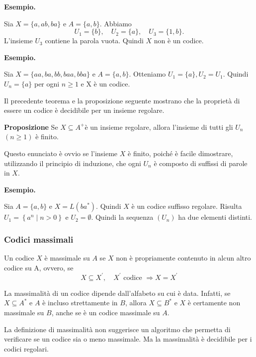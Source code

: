 \textbf{Esempio.}

Sia $X=\{a, a b, b a\}$ e $A=\{a, b\}$. Abbiamo
$$
U_{1}=\{b\}, \quad U_{2}=\{a\}, \quad U_{3}=\{1, b\} .
$$
L'insieme $U_{3}$ contiene la parola vuota. Quindi $X$ non è un codice.

\vspace{5mm}


\textbf{Esempio.}

Sia $X=\{a a, b a, b b, b a a, b b a\}$ e $A=\{a, b\} .$ Otteniamo $U_{1}=\{a\}, U_{2}=U_{1}$. Quindi $U_{n}=\{a\}$ per ogni $n \geq 1$ e X è un codice.

\vspace{5mm}

Il precedente teorema e la proposizione seguente mostrano che la proprietà di essere un codice è decidibile per un insieme regolare.


\textbf{Proposizione}
Se $X \subseteq A^{+}$è un insieme regolare, allora l'insieme di tutti gli $U_{n}$ $(n \geq 1)$ è finito.

Questo enunciato è ovvio se l'insieme $X$ è finito, poiché è facile dimostrare, utilizzando il principio di induzione, che ogni $U_{n}$ è composto di suffissi di parole in $X$.

\vspace{5mm}

\textbf{Esempio.}

Sia $A=\{a, b\}$ e $X=L\left(b a^{*}\right)$. Quindi $X$ è un codice suffisso regolare.
Risulta $U_{1}=\left\{a^{n} \mid n>0\right\}$ e $U_{2}=\emptyset$. Quindi la sequenza $\left(U_{n}\right)$ ha due elementi distinti.

\subsubsection{Codici massimali}

Un codice $X$ è massimale su $A$ se $X$ non è propriamente contenuto in alcun altro codice su A, ovvero, se
$$
X \subseteq X^{\prime}, \quad X^{\prime} \text { codice } \Rightarrow X=X^{\prime}
$$

La massimalità di un codice dipende dall'alfabeto su cui è data. Infatti, se $X \subseteq A^{*}$ e $A$ è incluso strettamente in $B$, allora $X \subseteq B^{*}$ e $X$ è certamente non massimale su $B$, anche se è un codice massimale su $A$.

La definizione di massimalità non suggerisce un algoritmo che permetta di verificare se un codice sia o meno massimale.
Ma la massimalità è decidibile per i codici regolari.

